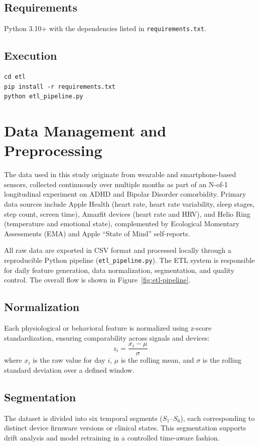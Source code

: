 \documentclass[12pt,a4paper]{article}
\begin{document}
\subsection{Requirements}
Python 3.10+ with the dependencies listed in \texttt{requirements.txt}.

\subsection{Execution}
\begin{verbatim}
cd etl
pip install -r requirements.txt
python etl_pipeline.py
\end{verbatim}

\section{Data Management and Preprocessing}

The data used in this study originate from wearable and smartphone-based sensors, collected continuously over multiple months as part of an N-of-1 longitudinal experiment on ADHD and Bipolar Disorder comorbidity. 
Primary data sources include Apple Health (heart rate, heart rate variability, sleep stages, step count, screen time), Amazfit devices (heart rate and HRV), and Helio Ring (temperature and emotional state), complemented by Ecological Momentary Assessments (EMA) and Apple “State of Mind” self-reports.

All raw data are exported in CSV format and processed locally through a reproducible Python pipeline (\texttt{etl\_pipeline.py}). The ETL system is responsible for daily feature generation, data normalization, segmentation, and quality control. The overall flow is shown in Figure~\ref{fig:etl-pipeline}.

\subsection*{Normalization}
Each physiological or behavioral feature is normalized using z-score standardization, ensuring comparability across signals and devices:
\[
z_i = \frac{x_i - \mu}{\sigma}
\]
where $x_i$ is the raw value for day $i$, $\mu$ is the rolling mean, and $\sigma$ is the rolling standard deviation over a defined window.

\subsection*{Segmentation}
The dataset is divided into six temporal segments ($S_1$–$S_6$), each corresponding to distinct device firmware versions or clinical states. This segmentation supports drift analysis and model retraining in a controlled time-aware fashion.
\end{document}
